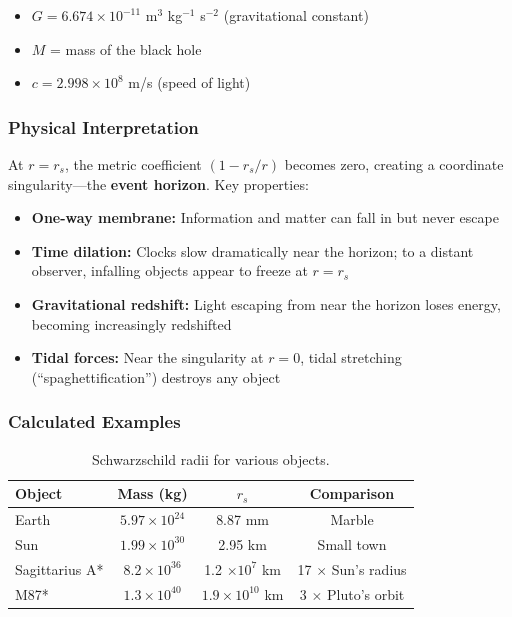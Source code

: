 \documentclass[11pt,a4paper]{article}
\begin{document}
\begin{itemize}[noitemsep]
    \item $G = 6.674 \times 10^{-11}$ m$^3$ kg$^{-1}$ s$^{-2}$ (gravitational constant)
    \item $M$ = mass of the black hole
    \item $c = 2.998 \times 10^8$ m/s (speed of light)
\end{itemize}

\subsubsection{Physical Interpretation}

At $r = r_s$, the metric coefficient $(1 - r_s/r)$ becomes zero, creating a coordinate singularity---the \textbf{event horizon}. Key properties:

\begin{itemize}[noitemsep]
    \item \textbf{One-way membrane:} Information and matter can fall in but never escape
    \item \textbf{Time dilation:} Clocks slow dramatically near the horizon; to a distant observer, infalling objects appear to freeze at $r = r_s$
    \item \textbf{Gravitational redshift:} Light escaping from near the horizon loses energy, becoming increasingly redshifted
    \item \textbf{Tidal forces:} Near the singularity at $r = 0$, tidal stretching (``spaghettification'') destroys any object
\end{itemize}

\subsubsection{Calculated Examples}

\begin{table}[H]
\centering
\caption{Schwarzschild radii for various objects.}
\label{tab:schwarzschild}
\begin{tabular}{|l|c|c|c|}
\hline
\textbf{Object} & \textbf{Mass (kg)} & \textbf{$r_s$} & \textbf{Comparison} \\
\hline
Earth & $5.97 \times 10^{24}$ & 8.87 mm & Marble \\
Sun & $1.99 \times 10^{30}$ & 2.95 km & Small town \\
Sagittarius A* & $8.2 \times 10^{36}$ & 1.2 $\times 10^{7}$ km & 17 $\times$ Sun's radius \\
M87* & $1.3 \times 10^{40}$ & $1.9 \times 10^{10}$ km & 3 $\times$ Pluto's orbit \\
\hline
\end{tabular}
\end{table}
\end{document}
